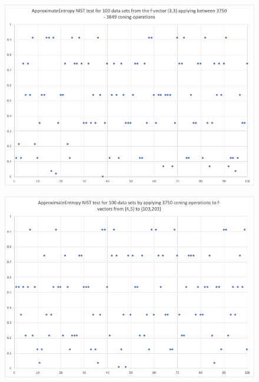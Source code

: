 \documentclass[oneside,12pt]{amsart}
\theoremstyle{definition}
\numberwithin{equation}{section}
\begin{document}
\begin{figure}[h!]
\centering
\includegraphics[scale=.5]{./charts/ApproximateEntropy_3_3.png}
\label{fig:approxentropy33}
\end{figure}

\begin{figure}[h!]
\centering
\includegraphics[scale=.5]{./charts/ApproximateEntropy_4_5.png}
\label{fig:approxentropy45}
\end{figure}
\end{document}
